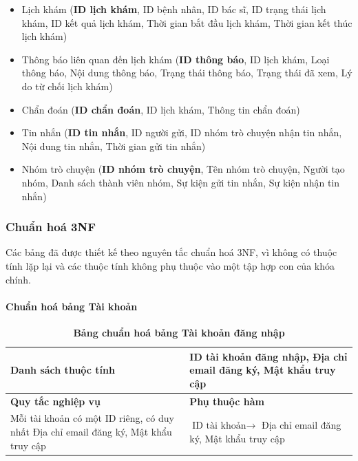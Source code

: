 \begin{itemize}
	\item Lịch khám (\textbf{ID lịch khám}, ID bệnh nhân, ID bác sĩ, ID trạng thái lịch khám, ID kết quả lịch khám, Thời gian bắt đầu lịch khám, Thời gian kết thúc lịch khám)
	\item Thông báo liên quan đến lịch khám (\textbf{ID thông báo}, ID lịch khám, Loại thông báo, Nội dung thông báo, Trạng thái thông báo, Trạng thái đã xem, Lý do từ chối lịch khám)
	\item Chẩn đoán (\textbf{ID chẩn đoán}, ID lịch khám, Thông tin chẩn đoán)
	\item Tin nhắn (\textbf{ID tin nhắn}, ID người gửi, ID nhóm trò chuyện nhận tin nhắn, Nội dung tin nhắn, Thời gian gửi tin nhắn)
	\item Nhóm trò chuyện (\textbf{ID nhóm trò chuyện}, Tên nhóm trò chuyện, Người tạo nhóm, Danh sách thành viên nhóm, Sự kiện gửi tin nhắn, Sự kiện nhận tin nhắn)

\end{itemize}
\subsubsection{Chuẩn hoá 3NF}
Các bảng đã được thiết kế theo nguyên tắc chuẩn hoá 3NF, vì không có thuộc tính lặp lại và các thuộc tính không phụ thuộc vào một tập hợp con của khóa chính.

\paragraph{Chuẩn hoá bảng Tài khoản}
\mbox{}
\begin{table}[H]
	\caption{\bfseries \fontsize{12pt}{0pt}\selectfont Bảng chuẩn hoá bảng Tài khoản đăng nhập}
	\centering
	\begin{tabularx}{0.9\textwidth}{|X|X|}
		\hline
		\textbf{Danh sách thuộc tính} & ID tài khoản đăng nhập, Địa chỉ email đăng ký, Mật khẩu truy cập                                   \\
		\hline
		\textbf{Quy tắc nghiệp vụ}    & \textbf{Phụ thuộc hàm}                                                                             \\
		\hline
		Mỗi tài khoản có một ID riêng, có duy nhất Địa chỉ email đăng ký, Mật khẩu truy cập
		                              & \parbox[t]{\linewidth}{$\text{ID tài khoản} \rightarrow$ Địa chỉ email đăng ký, Mật khẩu truy cập} \\
		\hline
		                                             \\
		                                                       \\
		\hline
	\end{tabularx}
\end{table}

